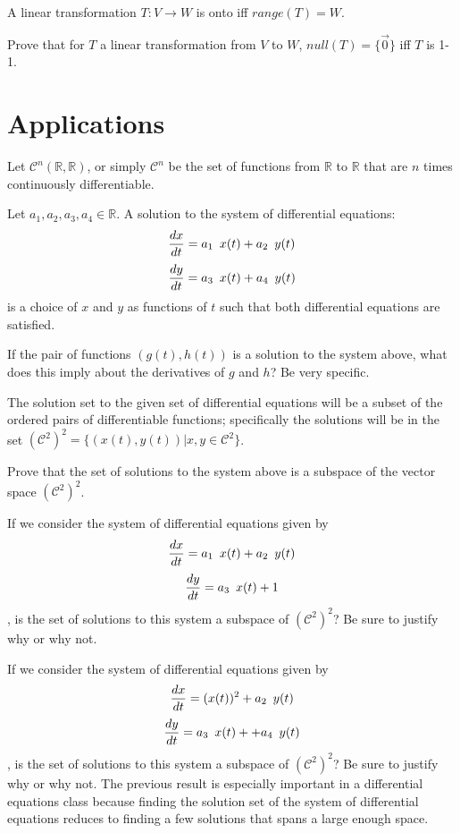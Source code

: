 \begin{theorem} A linear transformation $T:V \rightarrow W$ is onto iff $range(T)=W$. \end{theorem}

\bq Prove that for $T$ a linear transformation from $V$ to $W$, \break $null(T)=\{ \vec{0} \}$ iff $T$ is 1-1.
\eq

\section{Applications}
\begin{definition}
Let $\mathcal{C}^n(\mathbb{R},\mathbb{R})$, or simply $\mathcal{C}^n$ be the set of functions from $\mathbb{R}$ to $\mathbb{R}$ that are $n$ times continuously differentiable.
\end{definition}
\bq Let $a_1,a_2,a_3,a_4 \in \mathbb{R}$. A solution to the system of differential equations: $$\dfrac{dx}{dt} = a_1 \enskip x(t)+a_2 \enskip y(t)$$ $$\dfrac{dy}{dt} = a_3 \enskip x(t) +a_4 \enskip y(t) $$ is a choice of $x$ and $y$ as functions of $t$ such that both differential equations are satisfied.
\be
\item If the pair of functions $(g(t),h(t))$ is a solution to the system above, what does this imply about the derivatives of $g$ and $h$? Be very specific.

The solution set to the given set of differential equations will be a subset of the ordered pairs of differentiable functions; specifically the solutions will be in the set $(\mathcal{C}^2)^2=\{ (x(t),y(t))|x,y \in \mathcal{C}^2\}$.

\item Prove that the set of solutions to the system above is a subspace of the vector space $(\mathcal{C}^2)^2$.
\item If we consider the system of differential equations given by $$\dfrac{dx}{dt} = a_1 \enskip x(t)+a_2 \enskip y(t)$$ $$\dfrac{dy}{dt} = a_3 \enskip x(t) + 1  $$, is the set of solutions to this system a subspace of $(\mathcal{C}^2)^2$? Be sure to justify why or why not.
\item \item If we consider the system of differential equations given by $$\dfrac{dx}{dt} =  (x(t))^2 +a_2 \enskip y(t)$$ $$\dfrac{dy}{dt} = a_3 \enskip x(t) + +a_4 \enskip y(t)  $$, is the set of solutions to this system a subspace of $(\mathcal{C}^2)^2$? Be sure to justify why or why not.
\ee
\eq
The previous result is especially important in a differential equations class because finding the solution set of the system of differential equations reduces to finding a few solutions that spans a large enough space.


